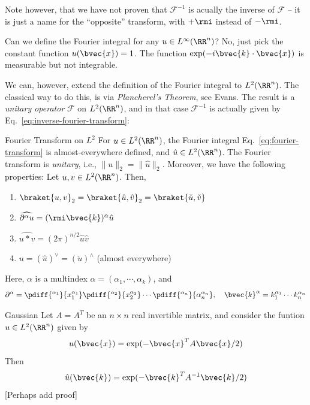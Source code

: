 Note however, that we have not proven that $\mathcal{F}^{-1}$ is acually the inverse of $\mathcal{F}$ -- it is just a name for the ``opposite'' transform, with $+\rmi$ instead of $-\rmi$.


Can we define the Fourier integral for any $u \in L^\infty(\RR^n)$? No, just pick the constant function $u(\bvec{x}) = 1$. The function $\exp(-i\bvec{k}\cdot\bvec{x})$ is measurable but not integrable.

We can, however, extend the definition of the Fourier integral to $L^2(\RR^n)$. The classical way to do this, is via \emph{Plancherel's Theorem}, see Evans. The result is a \emph{unitary operator} $\mathcal{F}$ on $L^2(\RR^n)$, and in that case $\mathcal{F}^{-1}$ is actually given by Eq.~\eqref{eq:inverse-fourier-transform}:
\begin{myTheorem}{Fourier Transform on $L^2$}{}
For $u \in L^2(\RR^n)$, the Fourier integral Eq.~\eqref{eq:fourier-transform} is almost-everywhere defined, and $\hat{u} \in L^2(\RR^n)$. The Fourier transform is \emph{unitary}, i.e., $\|u\|_2 = \|\hat{u}\|_2$. Moreover, we have the following properties: Let $u,v\in L^2(\RR^n)$. Then,
\begin{enumerate}
    \item $\braket{u,v}_2 = \braket{\hat{u},\hat{v}}_2 = \braket{\check{u},\check{v}}$
    \item $\widehat{\partial^\alpha u} = (\rmi\bvec{k})^\alpha \hat{u}$ 
    \item $\widehat{u * v} = (2\pi)^{n/2} \hat{u}\hat{v}$ 
    \item $u = (\hat{u})^\vee = (\check{u})^\wedge$ (almost everywhere) 
\end{enumerate}
\end{myTheorem}

Here, $\alpha$ is a multindex $\alpha = (\alpha_1,\cdots,\alpha_k)$, and 
\begin{equation}
    \partial^\alpha = \pdiff{^{\alpha_1}}{x_1^{\alpha_1}}\pdiff{^{\alpha_2}}{x_2^{\alpha_2}}\cdots\pdiff{^{\alpha_n}}{\alpha_n^{\alpha_n}}, \quad \bvec{k}^\alpha = k_1^{\alpha_1}\cdots k_n^{\alpha_n}
\end{equation}

\begin{myExample}{Gaussian}{}
Let $A = A^T$ be an $n\times n$ real invertible matrix, and consider the funtion $u \in L^2(\RR^n)$ given by
\begin{equation} u(\bvec{x}) = \exp(-\bvec{x}^T A \bvec{x}/2)
\end{equation}
Then
\begin{equation} \hat{u}(\bvec{k}) = \exp(-\bvec{k}^T A^{-1} \bvec{k}/2)
\end{equation}
[Perhaps add proof]
\end{myExample}

